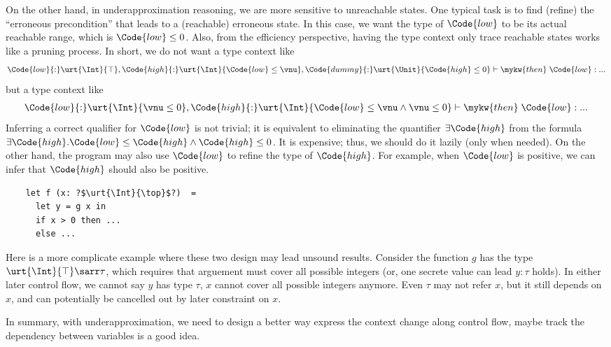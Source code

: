 On the other hand, in underapproximation reasoning, we are more sensitive to unreachable states. One typical task is to find (refine) the ``erroneous precondition'' that leads to a (reachable) erroneous state. In this case, we want the type of $\Code{low}$ to be its actual reachable range, which is $\Code{low} \leq 0$. Also, from the efficiency perspective, having the type context only trace reachable states works like a pruning process. In short, we do not want a type context like
\begin{align*}
    \Code{low}{:}\urt{\Int}{\top},  \Code{high}{:}\urt{\Int}{\Code{low} \leq \vnu}, \Code{dummy}{:}\urt{\Unit}{\Code{high} \leq 0} \vdash \mykw{then}\; \Code{low} : ...
\end{align*}\noindent
but a type context like
\begin{align*}
    \Code{low}{:}\urt{\Int}{\vnu \leq 0},  \Code{high}{:}\urt{\Int}{\Code{low} \leq \vnu \land \vnu \leq 0} \vdash \mykw{then}\; \Code{low} : ...
\end{align*}\noindent
Inferring a correct qualifier for $\Code{low}$ is not trivial; it is equivalent to eliminating the quantifier $\exists \Code{high}$ from the formula $\exists \Code{high}. \Code{low} \leq \Code{high} \land \Code{high} \leq 0$. It is expensive; thus, we should do it lazily (only when needed). On the other hand, the program may also use $\Code{low}$ to refine the type of $\Code{high}$. For example, when $\Code{low}$ is positive, we can infer that $\Code{high}$ should also be positive.

\begin{verbatim}
    let f (x: ?$\urt{\Int}{\top}$?)  =
      let y = g x in
      if x > 0 then ...
      else ...
\end{verbatim}

Here is a more complicate example where these two design may lead unsound results. Consider the function $g$ has the type $\urt{\Int}{\top} \sarr \tau$, which requires that arguement must cover all possible integers (or, one secrete value can lead $y{:}\tau$ holds). In either later control flow, we cannot say $y$ has type $\tau$, $x$ cannot cover all possible integers anymore. Even $\tau$ may not refer $x$, but it still depends on $x$, and can potentially be cancelled out by later constraint on $x$.

In summary, with underapproximation, we need to design a better way express the context change along control flow, maybe track the dependency between variables is a good idea.

